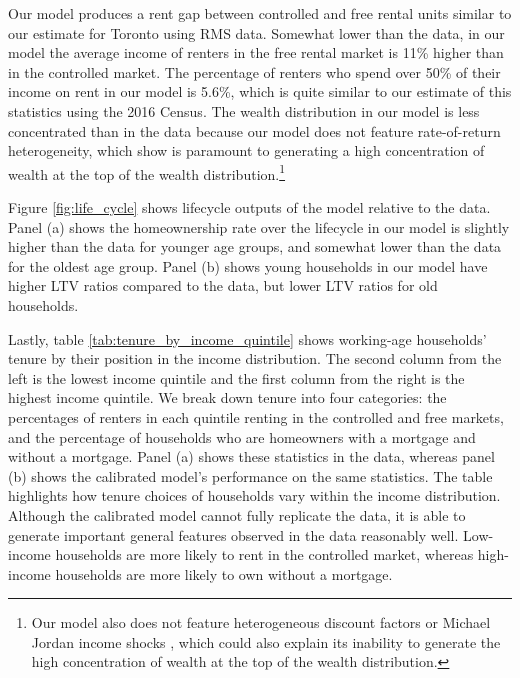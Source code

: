 \documentclass[parskip=full]{article}
\begin{document}
Our model produces a rent gap between controlled and free rental units similar to our estimate for Toronto using RMS data. Somewhat lower than the data, in our model the average income of renters in the free rental market is 11\% higher than in the controlled market. The percentage of renters who spend over 50\% of their income on rent in our model is 5.6\%, which is quite similar to our estimate of this statistics using the 2016 Census. The wealth distribution in our model is less concentrated than in the data because our model does not feature rate-of-return heterogeneity, which \citet{fagereng} show is paramount to generating a high concentration of wealth at the top of the wealth distribution.\footnote{Our model also does not feature heterogeneous discount factors \citep{ks-1998} or Michael Jordan income shocks \citep{mj-shocks}, which could also explain its inability to generate the high concentration of wealth at the top of the wealth distribution.}

Figure \ref{fig:life_cycle} shows lifecycle outputs of the model relative to the data. Panel (a) shows the homeownership rate over the lifecycle in our model is slightly higher than the data for younger age groups, and somewhat lower than the data for the oldest age group. Panel (b) shows young households in our model have higher LTV ratios compared to the data, but lower LTV ratios for old households. 

Lastly, table \ref{tab:tenure_by_income_quintile} shows working-age households' tenure by their position in the income distribution. The second column from the left is the lowest income quintile and the first column from the right is the highest income quintile. We break down tenure into four categories: the percentages of renters in each quintile renting in the controlled and free markets, and the percentage of households who are homeowners with a mortgage and without a mortgage. Panel (a) shows these statistics in the data, whereas panel (b) shows the calibrated model's performance on the same statistics. The table highlights how tenure choices of households vary within the income distribution. Although the calibrated model cannot fully replicate the data, it is able to generate important general features observed in the data reasonably well. Low-income households are more likely to rent in the controlled market, whereas high-income households are more likely to own without a mortgage.

\end{document}
